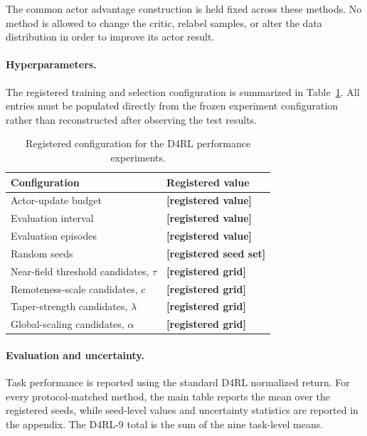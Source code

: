 The common actor advantage construction is held fixed across these
methods. No method is allowed to change the critic, relabel samples, or
alter the data distribution in order to improve its actor result.

\paragraph{Hyperparameters.}

The registered training and selection configuration is summarized in
Table~\ref{tab:d4rl_registered_config}. All entries must be populated
directly from the frozen experiment configuration rather than
reconstructed after observing the test results.

\begin{table}[t]
\centering
\caption{Registered configuration for the D4RL performance experiments.}
\label{tab:d4rl_registered_config}

\small
\setlength{\tabcolsep}{8pt}
\renewcommand{\arraystretch}{1.12}

\begin{tabular}{@{}ll@{}}
\toprule
Configuration & Registered value \\
\midrule
Actor-update budget
& \textbf{[registered value]} \\
Evaluation interval
& \textbf{[registered value]} \\
Evaluation episodes
& \textbf{[registered value]} \\
Random seeds
& \textbf{[registered seed set]} \\
Near-field threshold candidates, $\tau$
& \textbf{[registered grid]} \\
Remoteness-scale candidates, $c$
& \textbf{[registered grid]} \\
Taper-strength candidates, $\lambda$
& \textbf{[registered grid]} \\
Global-scaling candidates, $\alpha$
& \textbf{[registered grid]} \\
\bottomrule
\end{tabular}
\end{table}

\paragraph{Evaluation and uncertainty.}

Task performance is reported using the standard D4RL normalized return.
For every protocol-matched method, the main table reports the mean over
the registered seeds, while seed-level values and uncertainty
statistics are reported in the appendix. The D4RL-9 total is the sum of
the nine task-level means.

